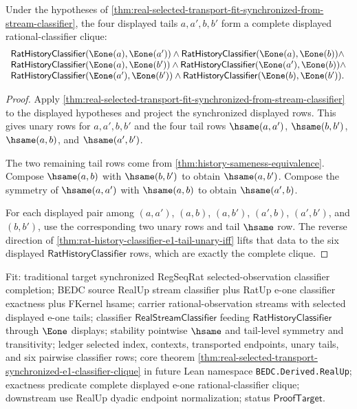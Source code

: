 \begin{theorem}
\label{thm:real-selected-transport-synchronized-e1-classifier-clique}
Under the hypotheses of
\autoref{thm:real-selected-transport-fit-synchronized-from-stream-classifier},
the four displayed tails $a,a',b,b'$ form a complete displayed
rational-classifier clique:
$$
\begin{array}{l}
\mathsf{RatHistoryClassifier}(\Eone(a),\Eone(a'))\land
\mathsf{RatHistoryClassifier}(\Eone(a),\Eone(b))\land\\
\mathsf{RatHistoryClassifier}(\Eone(a),\Eone(b'))\land
\mathsf{RatHistoryClassifier}(\Eone(a'),\Eone(b))\land\\
\mathsf{RatHistoryClassifier}(\Eone(a'),\Eone(b'))\land
\mathsf{RatHistoryClassifier}(\Eone(b),\Eone(b')).
\end{array}
$$
\end{theorem}
\begin{proof}
Apply
\autoref{thm:real-selected-transport-fit-synchronized-from-stream-classifier}
to the displayed hypotheses and project the synchronized displayed rows. This
gives unary rows for $a,a',b,b'$ and the four tail rows
$\hsame(a,a')$, $\hsame(b,b')$, $\hsame(a,b)$, and $\hsame(a',b')$.

The two remaining tail rows come from
\autoref{thm:history-sameness-equivalence}. Compose $\hsame(a,b)$ with
$\hsame(b,b')$ to obtain $\hsame(a,b')$. Compose the symmetry of
$\hsame(a,a')$ with $\hsame(a,b)$ to obtain $\hsame(a',b)$.

For each displayed pair among
$(a,a')$, $(a,b)$, $(a,b')$, $(a',b)$, $(a',b')$, and $(b,b')$, use the
corresponding two unary rows and tail $\hsame$ row. The reverse direction of
\autoref{thm:rat-history-classifier-e1-tail-unary-iff} lifts that data to the
six displayed $\mathsf{RatHistoryClassifier}$ rows, which are exactly the
complete clique.
\end{proof}

Fit: traditional target synchronized RegSeqRat selected-observation classifier
completion; BEDC source RealUp stream classifier plus RatUp e-one classifier
exactness plus FKernel hsame; carrier rational-observation streams with
selected displayed e-one tails; classifier $\mathsf{RealStreamClassifier}$
feeding $\mathsf{RatHistoryClassifier}$ through $\Eone$ displays; stability
pointwise $\hsame$ and tail-level symmetry and transitivity; ledger selected
index, contexts, transported endpoints, unary tails, and six pairwise
classifier rows; core theorem
\autoref{thm:real-selected-transport-synchronized-e1-classifier-clique} in
future Lean namespace \texttt{BEDC.Derived.RealUp}; exactness predicate
complete displayed e-one rational-classifier clique; downstream use RealUp
dyadic endpoint normalization; status $\mathsf{ProofTarget}$.

